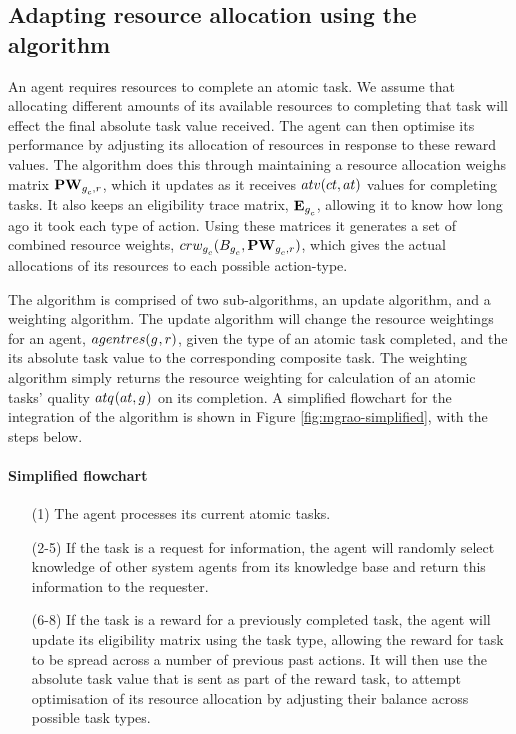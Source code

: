 \subsection{Adapting resource allocation using the \acronymMGRAO{}{} algorithm}
\label{section:solution_mgrao}

An agent requires resources to complete an atomic task. We assume that allocating different amounts of its available resources to completing that task will effect the final absolute task value received. The agent can then optimise its performance by adjusting its allocation of  resources in response to these reward values. The \acronymMGRAO{}{} algorithm does this through maintaining a resource allocation weighs matrix $\matrixResourceWeight{}{}$, which it updates as it receives $\functionTaskAbsoluteValue{}{}$ values for completing tasks. It also keeps an eligibility trace matrix, $\matrixEligibilityTrace{}{}$, allowing it to know how long ago it took each type of action. Using these matrices it generates a set of combined resource weights, $\functionCombinedResourceWeightsSignature{}{}$, which gives the actual allocations of its resources to each possible action-type.

The algorithm is comprised of two sub-algorithms, an update algorithm, and a weighting algorithm. The update algorithm will change the resource weightings for an agent, $\functionAgentResources{}{}$, given the type of an atomic task completed, and the its absolute task value to the corresponding composite task. The weighting algorithm simply returns the resource weighting for calculation of an atomic tasks' quality $\functionAtomicTaskQualitySignature{}{}$ on its completion. A simplified flowchart for the integration of the \acronymMGRAO{}{} algorithm is shown in Figure \ref{fig:mgrao-simplified}, with the steps below.

 \paragraph*{Simplified \acronymMGRAO{}{} flowchart}
\begin{enumerate}

	\item[(1)] The agent processes its current atomic tasks. 
	\item[(2-5)] If the task is a request for information, the agent will randomly select knowledge of other system agents from its knowledge base and return this information to the requester. 
	\item[(6-8)] If the task is a reward for a previously completed task, the agent will update its eligibility matrix using the task type, allowing the reward for task to be spread across a number of previous past actions. It will then use the absolute task value that is sent as part of the reward task, to attempt optimisation of its resource allocation by adjusting their balance across possible task types.  
\end{enumerate}

